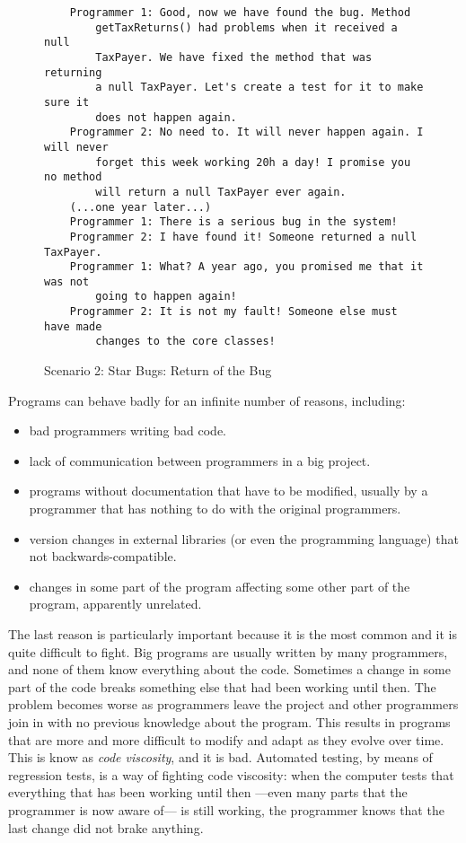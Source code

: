 \begin{figure}[tbp]
\begin{verbatim}
    Programmer 1: Good, now we have found the bug. Method 
        getTaxReturns() had problems when it received a null
        TaxPayer. We have fixed the method that was returning 
        a null TaxPayer. Let's create a test for it to make sure it
        does not happen again. 
    Programmer 2: No need to. It will never happen again. I will never
        forget this week working 20h a day! I promise you no method
        will return a null TaxPayer ever again. 
    (...one year later...)
    Programmer 1: There is a serious bug in the system!
    Programmer 2: I have found it! Someone returned a null TaxPayer. 
    Programmer 1: What? A year ago, you promised me that it was not
        going to happen again!
    Programmer 2: It is not my fault! Someone else must have made
        changes to the core classes!
\end{verbatim}  
  \caption{Scenario 2: Star Bugs: Return of the Bug}
  \label{fig:sdfsdsers}
\end{figure}

Programs can behave badly for an infinite number of reasons,
including: 

\begin{itemize}
\item bad programmers writing bad code.
\item lack of communication between programmers in a big project.
\item programs without documentation that have to be modified, usually
  by a programmer that has nothing to do with the original
  programmers.
\item version changes in external libraries (or even the programming
  language) that not backwards-compatible.
\item changes in some part of the program affecting some other part of
  the program, apparently unrelated. 
\end{itemize}

The last reason is particularly important because it is the most
common and it is quite difficult to fight. Big programs are usually
written by many programmers, and none of them know everything about
the code. Sometimes a change in some part of the code breaks something
else that had been working until then. The problem becomes worse as
programmers leave the project and other programmers join in with no
previous knowledge about the program. 
This results in programs that
are more and more difficult to modify and adapt as they evolve over
time. This is know as \emph{code viscosity}, and it is bad. Automated
testing, by means of regression tests, is a way of fighting code
viscosity: when the computer tests that everything that has been
working until then ---even many parts that the programmer is now aware
of--- is still working, the programmer knows that the last change did
not brake anything. 

